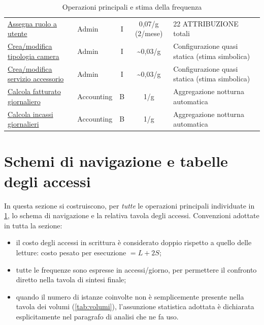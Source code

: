 \documentclass[a4paper,12pt]{report}
\begin{document}
\begin{table}[H]
{\begin{tabular}{|p{5.7cm}|l|c|c|p{4.5cm}|}
            \hyperref[sec:AssegnaRuolo]{Assegna ruolo a utente}                                  & Admin           & I             & 0,07/g (2/mese)         & 22 ATTRIBUZIONE totali                             \\
            \hyperref[sec:TipologiaCameraOp]{Crea/modifica tipologia camera}                     & Admin           & I             & \textasciitilde{}0,03/g & Configurazione quasi statica (stima simbolica)     \\
            \hyperref[sec:ServizioOp]{Crea/modifica servizio accessorio}                         & Admin           & I             & \textasciitilde{}0,03/g & Configurazione quasi statica (stima simbolica)     \\
            \hyperref[sec:FatturatoGiornaliero]{Calcola fatturato giornaliero}                   & Accounting      & B             & 1/g                     & Aggregazione notturna automatica                   \\
            \hyperref[sec:IncassiGiornalieri]{Calcola incassi giornalieri}                       & Accounting      & B             & 1/g                     & Aggregazione notturna automatica                   \\
            \hline
        \end{tabular}
    }
    \caption{Operazioni principali e stima della frequenza}
    \label{tab:operazioni}
\end{table}

\newpage

\section{Schemi di navigazione e tabelle degli accessi}
\label{sec:accessi}

In questa sezione si costruiscono, per \emph{tutte} le operazioni principali
individuate in \cref{tab:operazioni}, lo schema di navigazione e la
relativa tavola degli accessi.
\newline
Convenzioni adottate in tutta la sezione:
\begin{itemize}
    \item il costo degli accessi in scrittura è considerato doppio
          rispetto a quello delle letture: costo pesato per esecuzione $= L + 2S$;
    \item tutte le frequenze sono espresse in accessi/giorno, per
          permettere il confronto diretto nella tavola di sintesi finale;
    \item quando il numero di istanze coinvolte non è semplicemente presente nella tavola dei volumi (\cref{tab:volumi}), l'assunzione
          statistica adottata è dichiarata esplicitamente nel paragrafo di
          analisi che ne fa uso.
\end{itemize}
\end{document}
